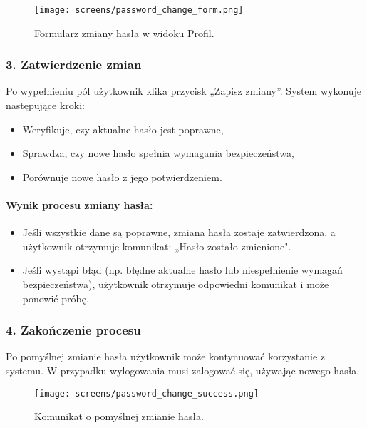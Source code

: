 \documentclass[12pt,a4paper,oneside]{article}
\theoremstyle{definition}
\numberwithin{equation}{section}
\begin{document}
\begin{figure}[H]
    \centering
    \texttt{[image: screens/password\_change\_form.png]}
    \caption{Formularz zmiany hasła w widoku Profil.}
    \label{fig:password_change_form}
\end{figure}

\subsubsection*{\textbf{3. Zatwierdzenie zmian}}
Po wypełnieniu pól użytkownik klika przycisk „Zapisz zmiany”. System wykonuje następujące kroki:
\begin{itemize}
    \item Weryfikuje, czy aktualne hasło jest poprawne,
    \item Sprawdza, czy nowe hasło spełnia wymagania bezpieczeństwa,
    \item Porównuje nowe hasło z jego potwierdzeniem.
\end{itemize}

\paragraph{Wynik procesu zmiany hasła:}
\begin{itemize}
    \item Jeśli wszystkie dane są poprawne, zmiana hasła zostaje zatwierdzona, a użytkownik otrzymuje komunikat: „Hasło zostało zmienione".
    \item Jeśli wystąpi błąd (np. błędne aktualne hasło lub niespełnienie wymagań bezpieczeństwa), użytkownik otrzymuje odpowiedni komunikat i może ponowić próbę.
\end{itemize}

\subsubsection*{\textbf{4. Zakończenie procesu}}
Po pomyślnej zmianie hasła użytkownik może kontynuować korzystanie z systemu. W przypadku wylogowania musi zalogować się, używając nowego hasła.

\begin{figure}[H]
    \centering
    \texttt{[image: screens/password\_change\_success.png]}
    \caption{Komunikat o pomyślnej zmianie hasła.}
    \label{fig:password_change_success}
\end{figure}



\renewcommand\refname{Literatura (jeżeli wymagana)}
%
%
%
%
\end{document}
